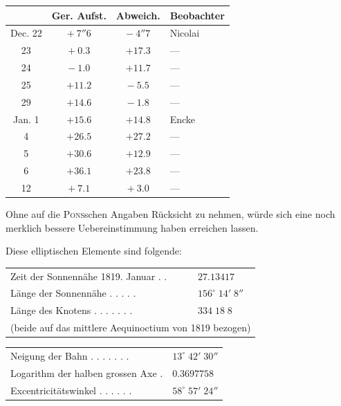 \begin{center}
\begin{tabular}{c|c|c|l}
& Ger. Aufst. & Abweich. & Beobachter \\
\hline
Dec. 22 & $+\ 7''6$  & $-\ 4''7$  & Nicolai \\
     23 & $+\ 0.3$   & $+17.3$    & --- \\
     24 & $-\ 1.0$   & $+11.7$    & --- \\
     25 & $+11.2$    & $-\ 5.5$   & --- \\
     29 & $+14.6$    & $-\ 1.8$   & --- \\
Jan.  1 & $+15.6$    & $+14.8$    & Encke \\
      4 & $+26.5$    & $+27.2$    & --- \\
      5 & $+30.6$    & $+12.9$    & --- \\
      6 & $+36.1$    & $+23.8$    & --- \\
     12 & $+\ 7.1$   & $+\ 3.0$   & --- \\
\end{tabular}
\end{center}

\par\indent Ohne auf die \textsc{Pons}schen Angaben Rücksicht zu nehmen, würde sich eine noch merklich
bessere Uebereinstimmung haben erreichen lassen.

\par\indent Diese elliptischen Elemente sind folgende:

\begin{center}
\begin{tabular}{ll}
Zeit der Sonnennähe 1819. Januar . . & $27.13417$\footnotemark \\
Länge der Sonnennähe . . . . . & $156^\circ\;14'\;8''$ \\
Länge des Knotens . . . . . . . & $334\;18\;8$ \\
\multicolumn{2}{l}{(beide auf das mittlere Aequinoctium von 1819 bezogen)} \\
\end{tabular}\par\smallskip
\begin{tabular}{ll}
Neigung der Bahn . . . . . . . & $13^\circ\;42'\;30''$ \\
Logarithm der halben grossen Axe . & $0.3697758$ \\
Excentricitätswinkel . . . . . . & $58^\circ\;57'\;24''$ \\
\end{tabular}
\end{center}

